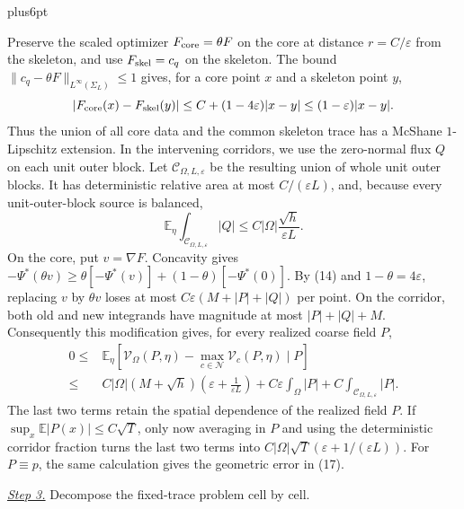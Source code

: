 \documentclass[11pt,reqno]{amsart}
\makeatletter
\theoremstyle{plain}
\theoremstyle{definition}
\theoremstyle{remark}
\renewenvironment{proof}[1][\proofname]{%
  \par
  \pushQED{\qed}%
  \normalfont
  \topsep6pt plus6pt\relax
  \trivlist
  \item[\hskip\labelsep\slshape #1\@addpunct{.}]%
  \ignorespaces
}{%
  \popQED
  \endtrivlist
  \@endpefalse
}
\DeclareRobustCommand{\qed}{%
  \leavevmode\unskip\penalty9999\hbox{}\nobreak
  \ifmmode
    \makebox[0pt][l]{\qquad\hbox{\qedsymbol}}%
  \else
    \qquad\hbox{\qedsymbol}%
  \fi
}
\renewcommand{\qedsymbol}{\rule[.47pt]{4pt}{6pt}}
\numberwithin{equation}{section}
\newcommand{\1}{\mathbf 1}
\makeatother
\begin{document}
\begin{proof}
Preserve the scaled optimizer $F_{\rm core}=\theta F$ on the core at
distance $r=C/\varepsilon$ from the skeleton, and use
$F_{\rm skel}=c_q$ on the skeleton.  The bound
$\|c_q-\theta F\|_{L^\infty(\Sigma_L)}\leq1$ gives, for a core point $x$
and a skeleton point $y$,
\begin{equation*}
|F_ {\rm core}(x)-F_ {\rm skel}(y)|
\leq C+(1-4\varepsilon)|x-y|\leq(1-\varepsilon)|x-y|.
\end{equation*}
Thus the union of all core data and the common skeleton trace has a
McShane $1$-Lipschitz extension.  In the intervening corridors, we use
the zero-normal flux $Q$ on each unit outer block.  Let
$\mathcal C_ {\Omega,L,\varepsilon}$ be the resulting union of whole
unit outer blocks.  It has deterministic relative area at most
$C/(\varepsilon L)$, and, because every unit-outer-block source is balanced,
\begin{equation}
\mathbb E_ \eta\int_ {\mathcal C_ {\Omega,L,\varepsilon}}|Q|
\leq C|\Omega|\frac{\sqrt h}{\varepsilon L}.
\tag{21a}
\end{equation}
On the core, put $v=\nabla F$.  Concavity gives
$-\Psi^*(\theta v)\geq\theta[-\Psi^*(v)]
+(1-\theta)[-\Psi^*(0)]$.  By (14) and $1-\theta=4\varepsilon$,
replacing $v$ by $\theta v$ loses at most
$C\varepsilon(M+|P|+|Q|)$ per point.  On the corridor, both old and new
integrands have magnitude at most $|P|+|Q|+M$.  Consequently this modification
gives, for every realized coarse field $P$,
\begin{equation}
\begin{split}
0\leq{}&\mathbb E_ \eta[\mathcal V_ \Omega(P,\eta)
-\max_ {c\in\mathcal N}\mathcal V_ c(P,\eta)\mid P]\\
\leq{}&C|\Omega|(M+\sqrt h)
\left(\varepsilon+\frac1{\varepsilon L}\right)
+C\varepsilon\int_ \Omega|P|
+C\int_ {\mathcal C_ {\Omega,L,\varepsilon}}|P|.          
\end{split}
\tag{21a'}
\end{equation}
The last two terms retain the spatial dependence of the realized field
$P$.  If
$\sup_ x\mathbb E|P(x)|\leq C\sqrt T$, only now averaging in $P$
and using the deterministic corridor fraction turns the last two terms
into $C|\Omega|\sqrt T(\varepsilon+1/(\varepsilon L))$.  For
$P\equiv p$, the same calculation gives the geometric error in (17).

\smallskip\noindent
\underline{\textit{Step 3.}} Decompose the fixed-trace problem cell by cell.


\end{proof}
\end{document}
